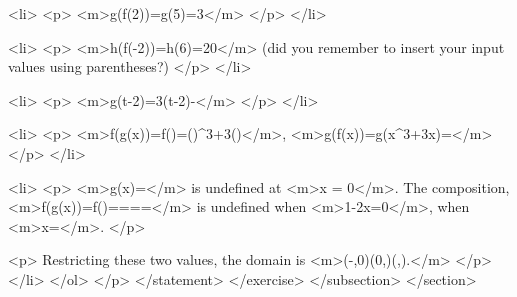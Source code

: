                         <li>
                            <p>
                                <m>g(f(2))=g(5)=3</m>
                            </p>
                        </li>

                        <li>
                            <p>
                                <m>h(f(-2))=h(6)=20</m> (did you remember to insert your input values using parentheses?)
                            </p>
                        </li>

                        <li>
                            <p>
                                <m>g(t-2)=3(t-2)-</m>
                            </p>
                        </li>

                        <li>
                            <p>
                                <m>f(g(x))=f()=()^{3}+3()</m>, <m>g(f(x))=g(x^{3}+3x)=</m>
                            </p>
                        </li>

                        <li>
                            <p>
                                <m>g(x)=</m> is undefined at <m>x = 0</m>. The composition, <m>f(g(x))=f()====</m> is undefined when <m>1-2x=0</m>, when <m>x=</m>.
                            </p>

                            <p>
                                Restricting these two values, the domain is <m>(-\infty,0)\cup(0,)\cup(,\infty).</m>
                            </p>
                        </li>
                    </ol>
                </p>
            </statement>
        </exercise>
    </subsection>
</section>